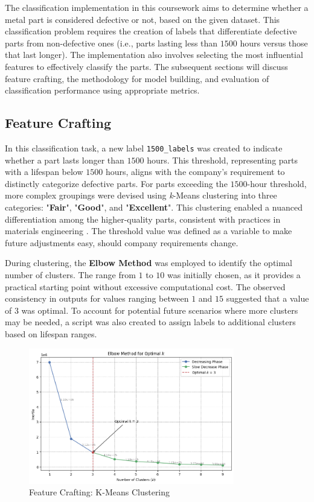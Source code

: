 \documentclass{article}
\begin{document}
The classification implementation in this coursework aims to determine whether a metal part is considered defective or not, based on the given dataset. This classification problem requires the creation of labels that differentiate defective parts from non-defective ones (i.e., parts lasting less than $1500$ hours versus those that last longer). The implementation also involves selecting the most influential features to effectively classify the parts. The subsequent sections will discuss feature crafting, the methodology for model building, and evaluation of classification performance using appropriate metrics.

\subsection{Feature Crafting}

In this classification task, a new label \texttt{1500\_labels} was created to indicate whether a part lasts longer than $1500$ hours. This threshold, representing parts with a lifespan below $1500$ hours, aligns with the company's requirement to distinctly categorize defective parts. For parts exceeding the $1500$-hour threshold, more complex groupings were devised using \emph{k}-Means clustering into three categories: "\textbf{Fair}", "\textbf{Good}", and "\textbf{Excellent}". This clustering enabled a nuanced differentiation among the higher-quality parts, consistent with practices in materials engineering \parencite{chen2023dataset, gorz2023feature}. The threshold value was defined as a variable to make future adjustments easy, should company requirements change.

During clustering, the \textbf{Elbow Method} was employed to identify the optimal number of clusters. The range from $1$ to $10$ was initially chosen, as it provides a practical starting point without excessive computational cost. The observed consistency in outputs for values ranging between $1$ and $15$ suggested that a value of $3$ was optimal. To account for potential future scenarios where more clusters may be needed, a script was also created to assign labels to additional clusters based on lifespan ranges.

\begin{figure}[htbp]
    \centering
    \includegraphics[width=0.8\textwidth]{./Images/FeatureCrafting-KMeanClustering.png}
    \caption{Feature Crafting: K-Means Clustering}
    \label{fig:feature_crafting_kmeans}
\end{figure}
\end{document}

